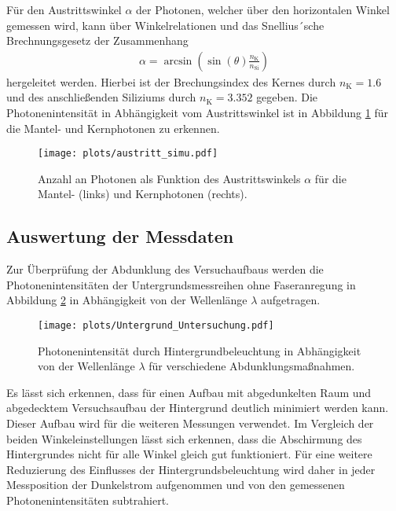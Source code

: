 Für den Austrittswinkel $\alpha$ der Photonen, welcher über den horizontalen Winkel gemessen wird, kann über Winkelrelationen und das Snellius´sche Brechnungsgesetz der Zusammenhang
\begin{align}
    \alpha = \arcsin \left( \sin(\theta)\frac{n_\mathrm{K}}{n_\mathrm{Si}}\right)
\end{align} 
hergeleitet werden. Hierbei ist der Brechungsindex des Kernes durch $n_\mathrm{K} = 1.6$ \cite{anleitung} und des anschließenden Siliziums durch $n_\mathrm{K} = 3.352$ \cite{si} gegeben.
Die Photonenintensität in Abhängigkeit vom Austrittswinkel ist in Abbildung \ref{fig:austritt_simu} für die Mantel- und Kernphotonen zu erkennen.
\begin{figure}
    \centering
    \texttt{[image: plots/austritt\_simu.pdf]}
    \caption{Anzahl an Photonen als Funktion des Austrittswinkels $\alpha$ für die Mantel- (links) und Kernphotonen (rechts). }
    \label{fig:austritt_simu}
\end{figure}
\FloatBarrier

\subsection{Auswertung der Messdaten}
Zur Überprüfung der Abdunklung des Versuchaufbaus werden die Photonenintensitäten der Untergrundsmessreihen ohne Faseranregung in Abbildung \ref{fig:Untergrund_Untersuchung} in Abhängigkeit von der Wellenlänge $\lambda$ aufgetragen.
\begin{figure}
    \centering
    \texttt{[image: plots/Untergrund\_Untersuchung.pdf]}
    \caption{Photonenintensität durch Hintergrundbeleuchtung in Abhängigkeit von der Wellenlänge $\lambda$ für verschiedene Abdunklungsmaßnahmen.}
    \label{fig:Untergrund_Untersuchung}
\end{figure}
\FloatBarrier
Es lässt sich erkennen, dass für einen Aufbau mit abgedunkelten Raum und abgedecktem Versuchsaufbau der Hintergrund deutlich minimiert werden kann. Dieser Aufbau wird für die weiteren Messungen verwendet. 
Im Vergleich der beiden Winkeleinstellungen lässt sich erkennen, dass die Abschirmung des Hintergrundes nicht für alle Winkel gleich gut funktioniert. 
Für eine weitere Reduzierung des Einflusses der Hintergrundsbeleuchtung wird daher in jeder Messposition der Dunkelstrom aufgenommen und von den gemessenen Photonenintensitäten subtrahiert.


